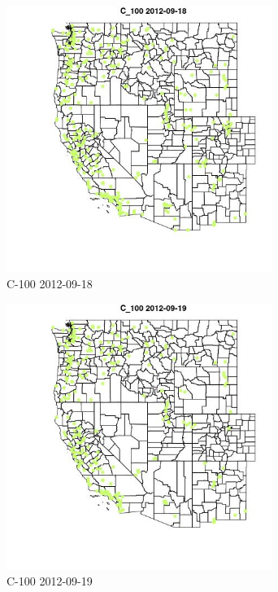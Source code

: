 \begin{figure} 
\centering  
\includegraphics[width=0.77\textwidth]{Code_Outputs/ML_input_report_ML_input_PM25_Step5_part_d_de_duplicated_aves_ML_input_MapObsC_1002012-09-18.jpg} 
\caption{\label{fig:ML_input_report_ML_input_PM25_Step5_part_d_de_duplicated_aves_ML_inputMapObsC_1002012-09-18}C-100 2012-09-18} 
\end{figure} 
 

\begin{figure} 
\centering  
\includegraphics[width=0.77\textwidth]{Code_Outputs/ML_input_report_ML_input_PM25_Step5_part_d_de_duplicated_aves_ML_input_MapObsC_1002012-09-19.jpg} 
\caption{\label{fig:ML_input_report_ML_input_PM25_Step5_part_d_de_duplicated_aves_ML_inputMapObsC_1002012-09-19}C-100 2012-09-19} 
\end{figure} 
 

